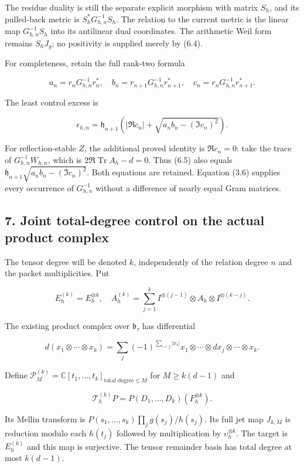 \documentclass[
]{article}
\begin{document}
The residue duality is still the separate explicit morphism with matrix
\(S_h\), and its pulled-back metric is \(S_h^*G_{h,n}^{-1}S_h\). The
relation to the current metric is the linear map \(G_{h,n}^{-1}S_h\)
into its antilinear dual coordinates. The arithmetic Weil form remains
\(S_hJ_g\); no positivity is supplied merely by (6.4).

For completeness, retain the full rank-two formula

\[a_n=r_nG_{h,n}^{-1}r_n^*,\quad b_n=r_{n+1}G_{h,n}^{-1}r_{n+1}^*,\quad c_n=r_nG_{h,n}^{-1}r_{n+1}^*.\]

The least control excess is

\[\epsilon_{h,n}=\mathfrak h_{n+1}\left(|\Re c_n|+\sqrt{a_nb_n-(\Im c_n)^2}\right).\tag{6.5}\]

For reflection-stable \(Z\), the additional proved identity is
\(\Re c_n=0\): take the trace of \(G_{h,n}^{-1}W_{h,n}\), which is
\(2\Re\operatorname{Tr}A_h-d=0\). Thus (6.5) also equals
\(\mathfrak h_{n+1}\sqrt{a_nb_n-(\Im c_n)^2}\). Both equations are
retained. Equation (3.6) supplies every occurrence of \(G_{h,n}^{-1}\)
without a difference of nearly equal Gram matrices.

\subsection{7. Joint total-degree control on the actual product
complex}\label{joint-total-degree-control-on-the-actual-product-complex}

The tensor degree will be denoted \(k\), independently of the relation
degree \(n\) and the packet multiplicities. Put

\[E_h^{(k)}=E_h^{\otimes k},\quad
A_h^{(k)}=\sum_{j=1}^k I^{\otimes(j-1)}\otimes A_h\otimes I^{\otimes(k-j)}.\]

The existing product complex over \(\mathfrak b_\tau\) has differential

\[d(x_1\otimes\cdots\otimes x_k)=\sum_j(-1)^{\sum_{i<j}|x_i|}x_1\otimes\cdots\otimes dx_j\otimes\cdots\otimes x_k.\]

Define
\(\mathcal P_M^{(k)}=\mathbb C[t_1,\ldots,t_k]_{\text{total degree}\le M}\)
for \(M\ge k(d-1)\) and

\[\mathcal T_h^{(k)}P=P(D_1,\ldots,D_k)(F_h^{\otimes k}).\tag{7.1}\]

Its Mellin transform is \(P(s_1,\ldots,s_k)\prod_j g(s_j)/h(s_j)\). Its
full jet map \(J_{k,M}\) is reduction modulo each \(h(t_j)\) followed by
multiplication by \(\upsilon_h^{\otimes k}\). The target is
\(E_h^{(k)}\) and this map is surjective. The tensor remainder basis has
total degree at most \(k(d-1)\).
\end{document}
